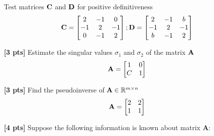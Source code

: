 \documentclass[11pt,addpoints,answers]{exam}
\numberwithin{equation}{section} %
\numberwithin{figure}{section} %
\numberwithin{table}{section} %
\begin{document}
\begin{questions}
    Test matrices $\mathbf{C}$ and $\mathbf{D}$ for positive definitiveness
    \begin{align*}
        \mathbf{C}=\begin{bmatrix}
                 2 & -1 & 0 \\
                 -1 & 2 & -1 \\
                 0 & -1 & 2
                \end{bmatrix};
        \mathbf{D}=\begin{bmatrix}
                 2 & -1 & b \\
                 -1 & 2 & -1 \\
                 b & -1 & 2
                \end{bmatrix}
    \end{align*}
    \begin{tcolorbox}[fit,height=3cm, width=\textwidth, blank, borderline={0.5pt}{-2pt},halign=center, valign=center, nobeforeafter]
    \end{tcolorbox}


    \question \textbf{[3 pts]}   Estimate the singular values $\sigma_1$ and $\sigma_2$ of the matrix $\mathbf{A}$
    \begin{align*}
        \mathbf{A} = \begin{bmatrix}
            1 & 0 \\ C & 1
        \end{bmatrix}
    \end{align*}

    \begin{tcolorbox}[fit,height=2cm, width=\textwidth, blank, borderline={0.5pt}{-2pt},halign=center, valign=center, nobeforeafter]
    \end{tcolorbox}

    \question \textbf{[3 pts]}  Find the pseudoinverse of $\mathbf{A} \in \mathbb{R}^{m \times n}$
    \begin{align*}
        \mathbf{A} = \begin{bmatrix}
            2 & 2 \\ 1 & 1
        \end{bmatrix}
    \end{align*}
    \begin{tcolorbox}[fit,height=2cm, width=\textwidth, blank, borderline={0.5pt}{-2pt},halign=center, valign=center, nobeforeafter]
    \end{tcolorbox}

    \question \textbf{[4 pts]} Suppose the following information is known about matrix $\mathbf{A}$:
    

\end{questions}
\end{document}
